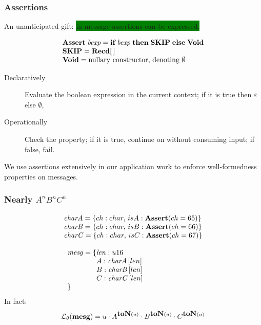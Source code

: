 \documentclass{beamer}
\newcommand{\gemph}[1]{\colorbox{green}{#1}}
\newcommand{\konst}[1]{\ensuremath{\mbox{\bf{#1}}}}
\newcommand{\LangTheta}[1]{\ensuremath{{\mathcal L}_{\theta}({#1})}}
\begin{document}
\begin{frame}\frametitle{Assertions}

An unanticipated gift: \gemph{in-message assertions can be expressed.}

\[
\begin{array}{l}
\konst{Assert}\;\mathit{bexp}  =
\konst{if}\; \mathit{bexp}\; \konst{then}\; \konst{SKIP} \;\konst{else}\;\konst{Void} \\
\konst{SKIP} = \konst{Recd} [\, ] \\
\konst{Void} = \text{nullary constructor, denoting } \emptyset
\end{array}
\]

\begin{description}
\item [Declaratively] Evaluate the boolean expression in the current context;
  if it is true then $\varepsilon$ else $\emptyset$,

\item [Operationally] Check the property; if it is true, continue on
  without consuming input; if false, fail.
\end{description}


We use assertions extensively in our application work to enforce
well-formedness properties on messages.

\end{frame}

\begin{frame}[fragile]\frametitle{Nearly $A^n B^n C^n$}

\[
\begin{array}{l}
  \mathit{charA} = \{ch : char, \,isA : \konst{Assert} (ch = 65)\} \\
  \mathit{charB} = \{ch : char, \,isB : \konst{Assert} (ch = 66)\} \\
  \mathit{charC} = \{ch : char, \,isC : \konst{Assert} (ch = 67)\} \\
\\
\begin{array}{l}
\mathit{mesg} = \{\mathit{len} : u16 \\
\phantom{\mathit{mesg} = \{} A : \mathit{charA}\, [len] \\
\phantom{\mathit{mesg} = \{} B : \mathit{charB}\, [len] \\
\phantom{\mathit{mesg} = \{} C : \mathit{charC}\, [len] \\
  \}
\end{array}
\end{array}
\]
%
In fact:
%
\[ \LangTheta{\konst{mesg}} = u \cdot A^{\konst{toN}(u)} \cdot
B^{\konst{toN}(u)} \cdot C^{\konst{toN}(u)} \]


\end{frame}
\end{document}
